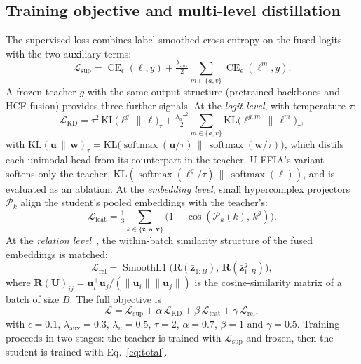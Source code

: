 \subsection{Training objective and multi-level distillation}
\label{sec:objective}
The supervised loss combines label-smoothed cross-entropy on the fused logits with the two
auxiliary terms:
\begin{equation}
  \mathcal{L}_{\mathrm{sup}} = \operatorname{CE}_{\epsilon}(\boldsymbol{\ell},y)
   + \tfrac{\lambda_{\mathrm{aux}}}{2}\!\!\sum_{m\in\{a,v\}}\!\!\operatorname{CE}_{\epsilon}(\boldsymbol{\ell}^{m},y).
  \label{eq:sup}
\end{equation}
A frozen teacher $g$ with the same output structure (pretrained backbones and HCF fusion) provides
three further signals. At the \emph{logit level}, with temperature $\tau$:
\begin{equation}
  \mathcal{L}_{\mathrm{KD}} = \tau^{2}\,\mathrm{KL}\big(\boldsymbol{\ell}^{g}\,\|\,\boldsymbol{\ell}\big)_{\tau}
   + \tfrac{\lambda_{u}\tau^{2}}{2}\!\!\sum_{m\in\{a,v\}}\!\!\mathrm{KL}\big(\boldsymbol{\ell}^{g,m}\,\|\,\boldsymbol{\ell}^{m}\big)_{\tau},
  \label{eq:kd}
\end{equation}
with $\mathrm{KL}(\mathbf{u}\,\|\,\mathbf{w})_{\tau}=\mathrm{KL}\big(\operatorname{softmax}(\mathbf{u}/\tau)\,\|\,\operatorname{softmax}(\mathbf{w}/\tau)\big)$,
which distils each unimodal head from its counterpart in the teacher. U-FFIA's variant~\cite{cui2024uffia}
softens only the teacher, $\mathrm{KL}(\operatorname{softmax}(\boldsymbol{\ell}^{g}/\tau)\,\|\,\operatorname{softmax}(\boldsymbol{\ell}))$,
and is evaluated as an ablation. At the \emph{embedding level}, small hypercomplex projectors
$\mathcal{P}_k$ align the student's pooled embeddings with the teacher's:
\begin{equation}
  \mathcal{L}_{\mathrm{feat}} = \tfrac{1}{3}\!\!\sum_{k\in\{\bar{\mathbf{z}},\bar{\mathbf{a}},\bar{\mathbf{v}}\}}\!\!
  \big(1-\cos(\mathcal{P}_k(k),\,k^{g})\big).
  \label{eq:feat}
\end{equation}
At the \emph{relation level}~\cite{park2019rkd}, the within-batch similarity structure of the fused
embeddings is matched:
\begin{equation}
  \mathcal{L}_{\mathrm{rel}} = \operatorname{SmoothL1}\big(\mathbf{R}(\bar{\mathbf{z}}_{1:B}),\,\mathbf{R}(\bar{\mathbf{z}}^{g}_{1:B})\big),
  \label{eq:rel}
\end{equation}
where $\mathbf{R}(\mathbf{U})_{ij}=\mathbf{u}_i^{\top}\mathbf{u}_j/(\|\mathbf{u}_i\|\|\mathbf{u}_j\|)$ is the cosine-similarity matrix of a batch of size $B$.
The full objective is
\begin{equation}
  \mathcal{L} = \mathcal{L}_{\mathrm{sup}} + \alpha\,\mathcal{L}_{\mathrm{KD}} + \beta\,\mathcal{L}_{\mathrm{feat}} + \gamma\,\mathcal{L}_{\mathrm{rel}},
  \label{eq:total}
\end{equation}
with $\epsilon=0.1$, $\lambda_{\mathrm{aux}}=0.3$, $\lambda_u=0.5$, $\tau=2$, $\alpha=0.7$, $\beta=1$ and $\gamma=0.5$.
Training proceeds in two stages: the teacher is trained with $\mathcal{L}_{\mathrm{sup}}$ and frozen, then
the student is trained with Eq.~\eqref{eq:total}.

